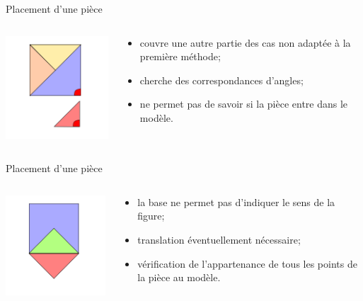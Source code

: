 \documentclass{beamer}
\begin{document}
\begin{frame}{Placement d'une pièce}

	\begin{columns}[c]
		\begin{column}{4cm}
    		\includegraphics[width=5cm]{place_figure_probleme_angle_match}
  		\end{column}
		\begin{column}{6.8cm}
			\begin{itemize}
				\item couvre une autre partie des cas non adaptée à la première méthode;
				\item cherche des correspondances d'angles;
				\item ne permet pas de savoir si la pièce entre dans le modèle.
			\end{itemize}
  		\end{column}
  		
	\end{columns}

\end{frame}

\begin{frame}{Placement d'une pièce}

	\begin{columns}[c]
		\begin{column}{4cm}
    		\includegraphics[width=5cm]{place_figure_probleme_symetrie_1}
  		\end{column}
		\begin{column}{6.5cm}
			\begin{itemize}
				\item la base ne permet pas d'indiquer le sens de la figure;
				\item translation éventuellement nécessaire;
				\item vérification de l'appartenance de tous les points de la pièce au modèle.
			\end{itemize}
  		\end{column}
  		
	\end{columns}

\end{frame}
\end{document}
